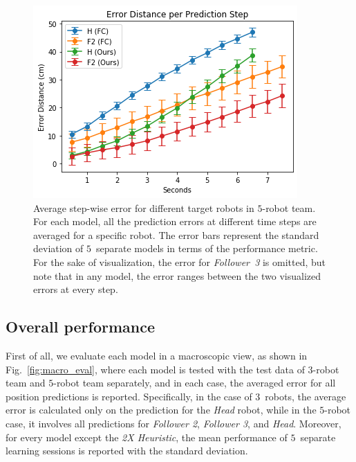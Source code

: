 \documentclass[letterpaper, 10 pt, conference]{ieeeconf}  %
\begin{document}
	\begin{figure}[t]
		\centering
		\includegraphics[width=1.\columnwidth]{fig_micro_eval}
		\caption{Average step-wise error for different target robots in $5$-robot team.
			For each model, all the prediction errors at different time steps are averaged
			for a specific robot. The error bars represent the standard deviation of
			$5$~separate models in terms of the performance metric. For the sake of
			visualization, the error for \emph{Follower~3} is omitted, but note that
			in any model, the error ranges between the two visualized errors at every step.
		}
		\label{fig:micro_eval}
	\end{figure}


	\subsection{Overall performance}
	\label{sec:overall_performance}

	First of all, we evaluate each model in a macroscopic view, as shown in
	Fig.~\ref{fig:macro_eval}, where each model is tested with the
	test data of $3$-robot team and $5$-robot team separately, and in each case,
	the averaged error for all position predictions is reported.
	Specifically, in the case of $3$~robots, the average error is calculated only on
	the prediction for the \emph{Head} robot, while in the $5$-robot case,
	it involves all predictions for \emph{Follower 2}, \emph{Follower 3}, and \emph{Head}.
	Moreover, for every model except the \emph{2X Heuristic}, the mean performance of
	$5$~separate learning sessions is reported with the standard deviation.
\end{document}
